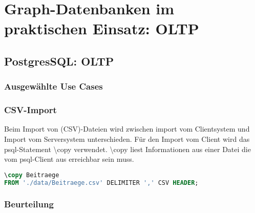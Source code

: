 \chapter{Graph-Datenbanken im praktischen Einsatz: OLTP}
\section{PostgresSQL: OLTP}
\subsection{Ausgewählte Use Cases}
\subsection{CSV-Import}
Beim Import von (CSV)-Dateien wird zwischen import vom Clientsystem und  Import vom Serversystem unterschieden. 
Für den Import vom Client wird das psql-Statement \textbackslash copy verwendet. \textbackslash copy liest Informationen aus einer Datei die vom psql-Client aus erreichbar sein muss. \cite{postgres2018}

\begin{lstlisting}[language=SQL,caption=CSV Input,frame=single]
\copy Beitraege 
FROM './data/Beitraege.csv' DELIMITER ',' CSV HEADER;
\end{lstlisting}


\subsection{Beurteilung}